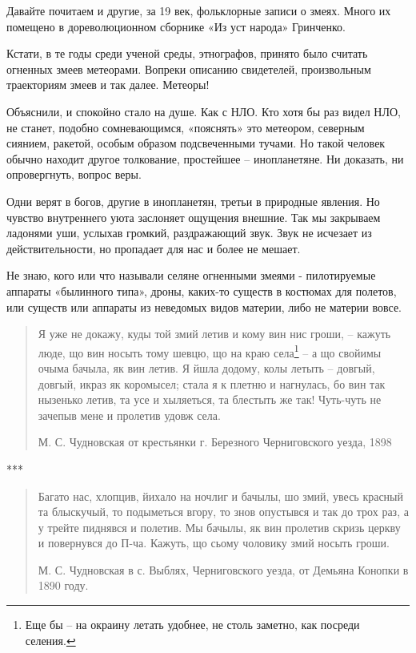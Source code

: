Давайте почитаем и другие, за 19 век, фольклорные записи о змеях. Много их помещено в дореволюционном сборнике «Из уст народа» Гринченко\cite{grinchenko01}.

Кстати, в те годы среди ученой среды, этнографов, принято было считать огненных змеев метеорами. Вопреки описанию свидетелей, произвольным траекториям змеев и так далее. Метеоры!

Объяснили, и спокойно стало на душе. Как с НЛО. Кто хотя бы раз видел НЛО, не станет, подобно сомневающимся, «пояснять» это метеором, северным сиянием, ракетой, особым образом подсвеченными тучами. Но такой человек обычно находит другое толкование, простейшее – инопланетяне. Ни доказать, ни опровергнуть, вопрос веры. 

Одни верят в богов, другие в инопланетян, третьи в природные явления. Но чувство внутреннего уюта заслоняет ощущения внешние. Так мы закрываем ладонями уши, услыхав громкий, раздражающий звук. Звук не исчезает из действительности, но пропадает для нас и более не мешает.

Не знаю, кого или что называли селяне огненными змеями - пилотируемые аппараты «былинного типа», дроны, каких-то существ в костюмах для полетов, или существ или аппараты из неведомых видов материи, либо не материи вовсе.

\begin{quotation}
Я уже не докажу, куды той змий летив и кому вин нис гроши, – кажуть люде, що вин носыть тому шевцю, що на краю села\footnote{Еще бы – на окраину летать удобнее, не столь заметно, как посреди селения.} – а що свойимы очыма бачыла, як вин летив. Я йшла додому, колы летыть – довгый, довгый, икраз як коромысел; стала я к плетню и нагнулась, бо вин так нызенько летив, та усе и хыляеться, та блестыть же так! Чуть-чуть не зачепыв мене и пролетив удовж села.

М. С. Чудновская от крестьянки г. Березного Черниговского уезда, 1898
\end{quotation}

\begin{center}
***\end{center}

\begin{quotation}
Багато нас, хлопцив, йихало на ночлиг и бачылы, шо змий, увесь красный та блыскучый, то подыметься вгору, то знов опустывся и так до трох раз, а у трейте пиднявся и полетив. Мы бачылы, як вин пролетив скризь церкву и повернувся до П-ча. Кажуть, що сьому чоловику змий носыть гроши.

М. С. Чудновская в с. Выблях, Черниговского уезда, от Демьяна Конопки в 1890 году.
\end{quotation}

